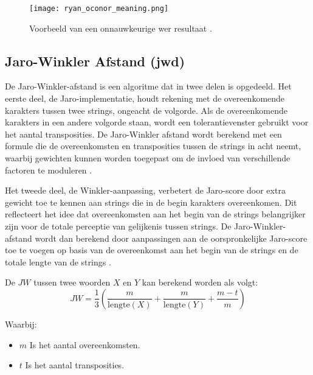 \begin{figure}[h]
    \centering
    \texttt{[image: ryan\_oconor\_meaning.png]}
    \captionsetup{justification=centering}
    \caption{Voorbeeld van een onnauwkeurige \gls{wer} resultaat \autocite{OConnor2023}.}
    \label{fig:voorbeeld}
\end{figure}

\subsection{Jaro-Winkler Afstand (\gls{jwd})}
De Jaro-Winkler-afstand is een algoritme dat in twee delen is opgedeeld. Het eerste deel, de Jaro-implementatie, houdt rekening met de overeenkomende karakters tussen twee strings, ongeacht de volgorde. Als de overeenkomende karakters in een andere volgorde staan, wordt een tolerantievenster gebruikt voor het aantal transposities. De Jaro-Winkler afstand wordt berekend met een formule die de overeenkomsten en transposities tussen de strings in acht neemt, waarbij gewichten kunnen worden toegepast om de invloed van verschillende factoren te moduleren \autocite{Rdazzi2023comparison}.

Het tweede deel, de Winkler-aanpassing, verbetert de Jaro-score door extra gewicht toe te kennen aan strings die in de begin karakters overeenkomen. Dit reflecteert het idee dat overeenkomsten aan het begin van de strings belangrijker zijn voor de totale perceptie van gelijkenis tussen strings. De Jaro-Winkler-afstand wordt dan berekend door aanpassingen aan de oorspronkelijke Jaro-score toe te voegen op basis van de overeenkomst aan het begin van de strings en de totale lengte van de strings \autocite{Rdazzi2023comparison}.

De \(JW\) tussen twee woorden \(X\) en \(Y\) kan berekend worden als volgt:
\begin{equation}
    JW = \frac{1}{3} \left( \frac{m}{\text{lengte}(X)} + \frac{m}{\text{lengte}(Y)} + \frac{m - t}{m} \right)
\end{equation}

Waarbij:
\begin{itemize}
    \item \(m\) Is het aantal overeenkomsten.
    \item \(t\) Is het aantal transposities.
\end{itemize}


